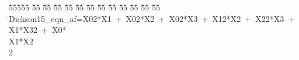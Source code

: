 %
%
\begin{tabbing}
55555 \= 55 \= 55 \= 55 \= 55 \= 55 \= 55 \= 55 \= 55 \= 55 \= 55 \= 55 \= 55 \= \>Dickson15\_eqn\_af=X02*X1\ +\ X02*X2\ +\ X02*X3\ +\ X12*X2\ +\ X22*X3\ +\ X1*X32\ +\ X0*\\[0pt]
\>X1*X2\\[0pt]
2\>\end{tabbing}
